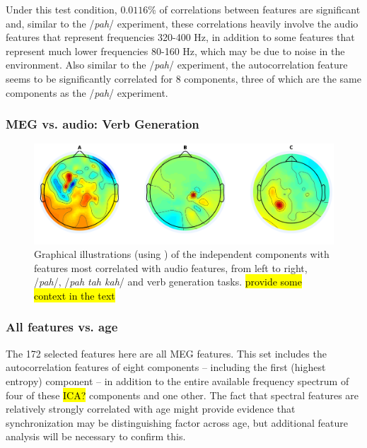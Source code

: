 \documentclass[a4paper]{article}
\newcommand{\FR}[1]{{\small \textcolor{red}{\hl{#1}}}}
\begin{document}
Under this test condition, $0.0116$\% of correlations between features are significant and, similar to the /{\em pah}/ experiment, these correlations heavily involve the audio features that represent frequencies 320-400 Hz, in addition to some features that represent much lower frequencies 80-160 Hz, which may be due to noise in the environment. Also similar to the /{\em pah}/ experiment, the autocorrelation feature seems to be significantly correlated for 8 components, three of which are the same components as the /{\em pah}/ experiment.


\subsubsection{MEG vs. audio: Verb Generation}

\begin{figure}[t]
  \centering
  \includegraphics[width=\linewidth]{AllComponents.png}
  \caption{Graphical illustrations (using \cite{Delorme04eeglab}) of the independent components with features most correlated with audio features, from left to right, /{\em pah}/, /{\em pah tah kah}/ and verb generation tasks. \FR{provide some context in the text}}
  \label{fig:components}
\end{figure}

\subsubsection{All features vs. age}

The 172 selected features here are all MEG features. This set includes the autocorrelation features of eight components -- including the first (highest entropy) component -- in addition to the entire available frequency spectrum of four of these \FR{ICA?} components and one other. The fact that spectral features are relatively strongly correlated with age might provide evidence that synchronization may be distinguishing factor across age, but additional feature analysis will be necessary to confirm this. 
\end{document}
